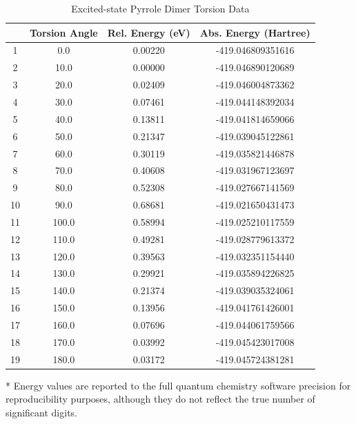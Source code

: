 \begin{table}[hbt!]\centering
\caption{Excited-state Pyrrole Dimer Torsion Data}
\renewcommand{\arraystretch}{1.5}
\begin{threeparttable}
\begin{tabular}{cccc}\toprule
  {} & {Torsion Angle} & {Rel. Energy (eV)} & {Abs. Energy (Hartree)} \\ \midrule
    1  & 0.0   & 0.00220 & -419.046809351616\\
    2  & 10.0  & 0.00000 & -419.046890120689\\
    3  & 20.0  & 0.02409 & -419.046004873362\\
    4  & 30.0  & 0.07461 & -419.044148392034\\
    5  & 40.0  & 0.13811 & -419.041814659066\\
    6  & 50.0  & 0.21347 & -419.039045122861\\
    7  & 60.0  & 0.30119 & -419.035821446878\\
    8  & 70.0  & 0.40608 & -419.031967123697\\
    9  & 80.0  & 0.52308 & -419.027667141569\\
    10 & 90.0  & 0.68681 & -419.021650431473\\
    11 & 100.0 & 0.58994 & -419.025210117559\\
    12 & 110.0 & 0.49281 & -419.028779613372\\
    13 & 120.0 & 0.39563 & -419.032351154440\\
    14 & 130.0 & 0.29921 & -419.035894226825\\
    15 & 140.0 & 0.21374 & -419.039035324061\\
    16 & 150.0 & 0.13956 & -419.041761426001\\
    17 & 160.0 & 0.07696 & -419.044061759566\\
    18 & 170.0 & 0.03992 & -419.045423017008\\
    19 & 180.0 & 0.03172 & -419.045724381281\\ \bottomrule
\end{tabular}
\begin{tablenotes}
\item[*] \footnotesize Energy values are reported to the full quantum chemistry software precision for reproducibility purposes, although they do not reflect the true number of significant digits.
\end{tablenotes}
\end{threeparttable}
\end{table}

